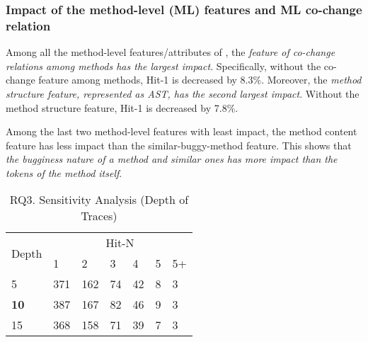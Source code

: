 
\vspace{-12pt}
\subsubsection{{\bf Impact of the method-level (ML) features and ML co-change relation}}

Among all the method-level features/attributes of {\tool}, the {\em
feature of co-change relations among methods has the largest impact}.
Specifically, without the co-change feature among methods, Hit-1 is
decreased by 8.3\%. Moreover, the {\it method structure feature,
represented as AST, has the second largest impact}. Without the
method structure feature, Hit-1 is decreased by 7.8\%.

Among the last two method-level features with least impact, the method
content feature has less impact than the similar-buggy-method
feature. This shows that {\em the bugginess nature of a method and
similar ones has more impact than the tokens of the method itself}.





\begin{table}[t]
	\caption{RQ3. Sensitivity Analysis (Depth of Traces)}
        \vspace{-9pt}
	{\small
		\begin{center}
			\renewcommand{\arraystretch}{1}
			\begin{tabular}{p{1cm}|p{0.3cm}<{\centering}|p{0.3cm}<{\centering}|p{0.3cm}<{\centering}|p{0.3cm}<{\centering}|p{0.3cm}<{\centering}|p{0.3cm}<{\centering}}
				\hline
				\multirow{2}{*}{Depth}    & \multicolumn{6}{c}{Hit-N}\\
				\cline{2-7}
				&1&2&3&4&5&5+\\
				
				\hline 
				5 			                & 371 & 162 & 74  & 42 & 8 & 3 \\
			{\bf	10}                         & 387 & 167 & 82  & 46 & 9 & 3   \\
				15	                        & 368 & 158 & 71  & 39 & 7 & 3 \\
				\hline
			\end{tabular}
			
			\label{fig:rq3-2}
		\end{center}
	}
\end{table}

